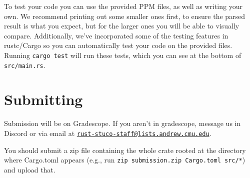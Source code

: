 \documentclass{article}
\begin{document}
To test your code you can use the provided PPM files, as well as writing your own. We recommend printing out some smaller ones first, to ensure the parsed result is what you expect, but for the larger ones you will be able to visually compare. 
Additionally, we've incorporated some of the testing features in rustc/Cargo so you can automatically test your code on the provided files. Running \texttt{cargo test} will run these tests, which you can see at the bottom of \texttt{src/main.rs}.

\section*{Submitting}

Submission will be on Gradescope. If you aren't in gradescope, message us in Discord or via email at \href{mailto:rust-stuco-staff@lists.andrew.cmu.edu}{\texttt{rust-stuco-staff@lists.andrew.cmu.edu}}.

You should submit a zip file containing the whole crate rooted at the directory where Cargo.toml appears (e.g., run \texttt{zip submission.zip Cargo.toml src/*}) and upload that.
\end{document}
